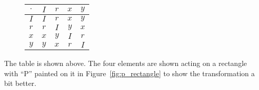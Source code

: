 \documentclass[../key.tex]{subfiles}
\begin{document}
\begin{figure}[h]
	\begin{center}
		\begin{minipage}[b]{\textwidth}
			\centering
			\begin{tabular}{c|cccc}
				\hline
				$\cdot$ & $I$ & $r$ & $x$ & $y$ \\ \hline
				\rowcolor{light-gray}
				$I$ & $I$ & $r$ & $x$ & $y$ \\
				$r$ & $r$ & $I$ & $y$ & $x$ \\
				\rowcolor{light-gray}
				$x$ & $x$ & $y$ & $I$ & $r$ \\
				$y$ & $y$ & $x$ & $r$ & $I$ \\ \hline
			\end{tabular}
			\vspace*{0.5\baselineskip}
		\end{minipage}
	\end{center}
	\vspace*{-\baselineskip}%
\end{figure}

\noindent The table is shown above. The four elements are shown acting on a rectangle with ``P'' painted on it in Figure~\ref{fig:p_rectangle} to show the transformation a bit better.
\end{document}
